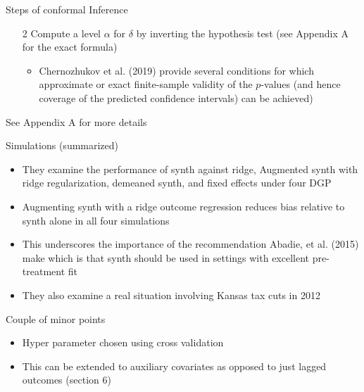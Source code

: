 \documentclass{beamer}
\begin{document}
\begin{frame}{Steps of conformal Inference}

\begin{enumerate}
\item [2] Compute a level $\alpha$ for $\delta$ by inverting the hypothesis test (see Appendix A for the exact formula)
	\begin{itemize}
	\item Chernozhukov et al. (2019) provide several conditions for which approximate or exact finite-sample validity of the $p$-values (and hence coverage of the predicted confidence intervals) can be achieved)
	\end{itemize}
\end{enumerate}

See Appendix A for more details

\end{frame}


\begin{frame}{Simulations (summarized)}

\begin{itemize}
\item They examine the performance of synth against ridge, Augmented synth with ridge regularization, demeaned synth, and fixed effects under four DGP
\item Augmenting synth with a ridge outcome regression reduces bias relative to synth alone in all four simulations
\item This underscores the importance of the recommendation Abadie, et al. (2015) make which is that synth should be used in settings with excellent pre-treatment fit
\item They also examine a real situation involving Kansas tax cuts in 2012
\end{itemize}

\end{frame}



\begin{frame}{Couple of minor points}

\begin{itemize}
\item Hyper parameter chosen using cross validation
\item This can be extended to auxiliary covariates as opposed to just lagged outcomes (section 6)
\end{itemize}

\end{frame}
\end{document}
